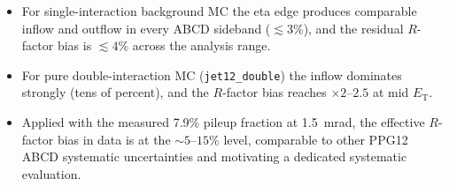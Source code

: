 \documentclass[11pt,letterpaper]{article}
\newcommand{\ET}{\ensuremath{E_{\text{T}}}}
\begin{document}
\begin{itemize}
  \item For single-interaction background MC the eta edge produces comparable
    inflow and outflow in every ABCD sideband ($\lesssim 3\%$), and the
    residual $R$-factor bias is $\lesssim 4\%$ across the analysis range.
  \item For pure double-interaction MC (\texttt{jet12\_double}) the inflow
    dominates strongly (tens of percent), and the $R$-factor bias reaches
    $\times 2$--$2.5$ at mid $\ET$.
  \item Applied with the measured 7.9\% pileup fraction at 1.5~mrad, the
    effective $R$-factor bias in data is at the $\sim 5$--$15\%$ level,
    comparable to other PPG12 ABCD systematic uncertainties and motivating
    a dedicated systematic evaluation.
\end{itemize}
\end{document}
